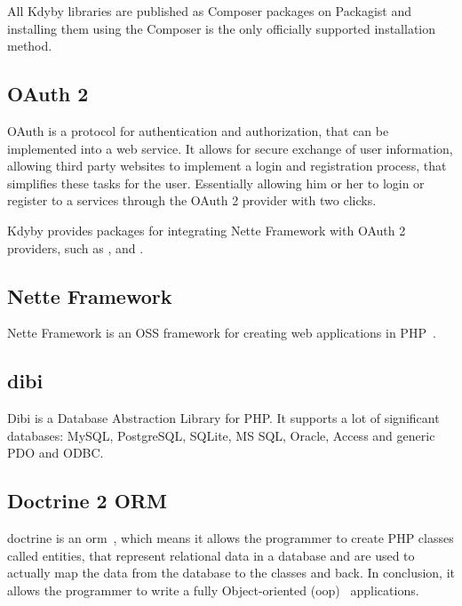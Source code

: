 All Kdyby libraries are published as Composer packages on Packagist and installing them using the Composer is the only officially supported installation method.

\tocless\subsection{OAuth 2} \label{sec:theory:oauth2}

OAuth is a protocol for authentication and authorization, that can be implemented into a web service. It allows for secure exchange of user information, allowing third party websites to implement a login and registration process, that simplifies these tasks for the user. Essentially allowing him or her to login or register to a services through the OAuth 2 provider with two clicks.

Kdyby provides packages for integrating Nette Framework with OAuth 2 providers, such as ,  and .

\tocless\subsection{Nette Framework} \label{sec:theory:nette}

Nette Framework is an OSS framework for creating web applications in PHP~\cite{wiki:nette}.

\tocless\subsection{dibi} \label{sec:theory:dibi}

Dibi is a Database Abstraction Library for PHP. It supports a lot of significant databases: MySQL, PostgreSQL, SQLite, MS SQL, Oracle, Access and generic PDO and ODBC.~\cite{dibi:homepage}

\tocless\subsection{Doctrine 2 ORM} \label{sec:theory:doctrine}

\gls{doctrine} is an \gls{orm}~\cite{wiki:orm}, which means it allows the programmer to create PHP classes called entities, that represent relational data in a database and are used to actually map the data from the database to the classes and back. In conclusion, it allows the programmer to write a fully Object-oriented (\acrshort{oop})~\cite{wiki:oop} applications.

